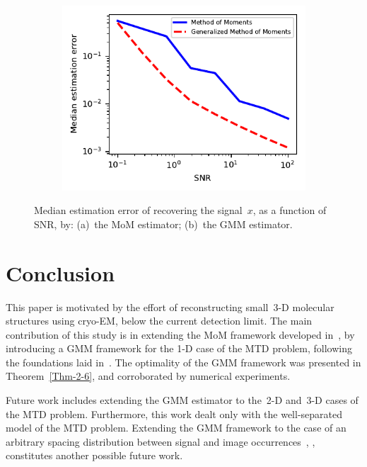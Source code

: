 \documentclass{article}
\begin{document}
\begin{figure}[!tb]
	\begin{subfigure}[ht]{\columnwidth}
		\centering
		\includegraphics[width=\columnwidth]{figures/experiment_SNR_err.pdf}
	\end{subfigure}
	\caption{Median estimation error of recovering the signal~$x$, as a function of SNR, by: (a)~the MoM estimator; (b)~the GMM estimator.}
\label{fig:err_noise_experiment}
\end{figure}

\section{Conclusion}
\label{sec:conclusion}
This paper is motivated by the effort of reconstructing small~\mbox{3-D} molecular structures using \mbox{cryo-EM}, below the current detection limit. The main contribution of this study is in extending the MoM framework developed in~\cite{bendory2019multi}, by introducing a GMM framework for the \mbox{1-D} case of the MTD problem, following the foundations laid in~\cite{abas2021generalized}. The optimality of the GMM framework was presented in Theorem~\ref{Thm-2-6}, and corroborated by numerical experiments.

Future work includes extending the GMM estimator to the~\mbox{2-D} and~\mbox{3-D} cases of the MTD problem. Furthermore, this work dealt only with the well-separated model of the MTD problem. Extending the GMM framework to the case of an arbitrary spacing distribution between signal and image occurrences~\cite{lan2020multi}, \cite{kreymer2021two}, constitutes another possible future work.

\vfill



\end{document}
